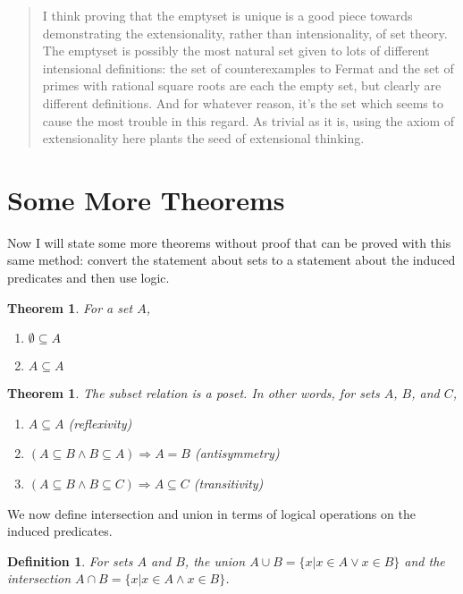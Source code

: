 \documentclass[12pt]{article}
\newcounter{dfnc}
\newcounter{thmc}
\newtheorem{dfn}[dfnc]{Definition}
\newtheorem{thm}[thmc]{Theorem}
\begin{document}
\begin{quote}

  I think proving that the emptyset is unique is a good piece towards
  demonstrating the extensionality, rather than intensionality, of set
  theory. The emptyset is possibly the most natural set given to lots
  of different intensional definitions: the set of counterexamples to
  Fermat and the set of primes with rational square roots are each the
  empty set, but clearly are different definitions. And for whatever
  reason, it's the set which seems to cause the most trouble in this
  regard. As trivial as it is, using the axiom of extensionality here
  plants the seed of extensional thinking.

\end{quote}

\section{Some More Theorems}

Now I will state some more theorems without proof that can be proved
with this same method: convert the statement about sets to a statement
about the induced predicates and then use logic.

\begin{thm}
  For a set $A$,
  \begin{enumerate}[label=\alph*)]
  \item $\emptyset\subseteq A$
  \item $A\subseteq A$
  \end{enumerate}
\end{thm}

\begin{thm}\label{thm:poset}
  The subset relation is a poset.  In other words, for sets $A$, $B$,
  and $C$,
  \begin{enumerate}[label=\alph*)]
  \item $A\subseteq A$ (reflexivity)
  \item $(A\subseteq B \wedge B\subseteq A)\Rightarrow A=B$ (antisymmetry)
  \item $(A\subseteq B \wedge B\subseteq C)\Rightarrow A\subseteq C$ (transitivity)
  \end{enumerate}
\end{thm}

We now define intersection and union in terms of logical operations on
the induced predicates.

\begin{dfn}
  For sets $A$ and $B$, the union $A\cup B = \{x|x\in A \vee x\in B\}$
  and the intersection $A\cap B = \{x|x\in A \wedge x\in B\}$.
\end{dfn}
\end{document}

